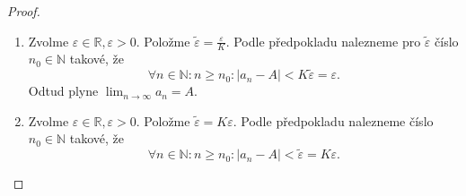\begin{proof}
	\,
	\begin{enumerate}
		\item[$\impliedby$] Zvolme $\varepsilon \in \mathbb R , \varepsilon > 0$. Položme $\tilde \varepsilon = \frac{\varepsilon}{K}$.
		Podle předpokladu nalezneme pro $\tilde\varepsilon$ číslo $n_0\in \mathbb N $ takové, že
		$$
		    \forall n\in \mathbb N : n \geq n_0: |a_n-A|<K\tilde\varepsilon = \varepsilon.
		$$
		Odtud plyne $\lim_{n \to \infty} a_n = A$.
		\item[$\implies$] Zvolme $\varepsilon \in \mathbb R , \varepsilon > 0$. Položme $\tilde\varepsilon = K\varepsilon$. Podle
		předpokladu nalezneme číslo $n_0\in \mathbb N $ takové, že
		$$
		    \forall n\in \mathbb N : n \geq n_0: |a_n-A|<\tilde\varepsilon = K\varepsilon.
		$$
\end{enumerate}
\end{proof}

